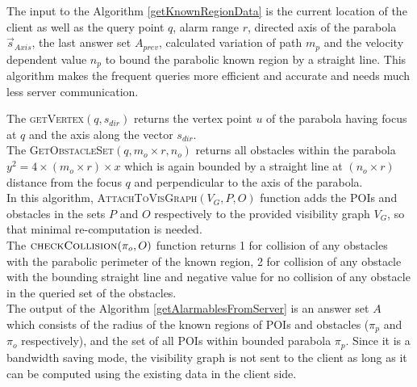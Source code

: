 The input to the Algorithm \ref{getKnownRegionData} is the current location of the client as well as the query point $q$, alarm range $r$, directed axis of the parabola $\vec{s}_{Axis}$, the last answer set $A_{prev}$, calculated variation of path $m_p$ and the velocity dependent value $n_p$ to bound the parabolic known region by a straight line. This algorithm makes the frequent queries more efficient and accurate and needs much less server communication.



The \textsc{getVertex}$(q, s_{dir})$ returns the vertex point $u$ of the parabola having focus at $q$ and the axis along the vector $s_{dir}$.\\


The \textsc{GetObstacleSet}$(q, m_o \times r, n_o)$ returns all obstacles within the parabola $y^2 = 4\times(m_o\times r)\times x$ which is again bounded by a straight line at $(n_o\times r)$ distance from the focus $q$ and perpendicular to the axis of the parabola.\\


In this algorithm, \textsc{AttachToVisGraph}$(V_G, P, O)$ function adds the POIs and obstacles in the sets $P$ and $O$ respectively to the provided visibility graph $V_G$, so that minimal re-computation is needed.\\
The $ \textsc{checkCollision}(\pi_o, O) $ function returns 1 for collision of any obstacles with the parabolic perimeter of the known region, 2 for collision of any obstacle with the bounding straight line and negative value for no collision of any obstacle in the queried set of the obstacles.\\
The output of the Algorithm \ref{getAlarmablesFromServer} is an answer set $A$ which consists of the radius of the known regions of POIs and obstacles ($\pi_p$ and $\pi_o$ respectively), and the set of all POIs within bounded parabola $\pi_p$. Since it is a bandwidth saving mode, the visibility graph is not sent to the client as long as it can be computed using the existing data in the client side.\\


